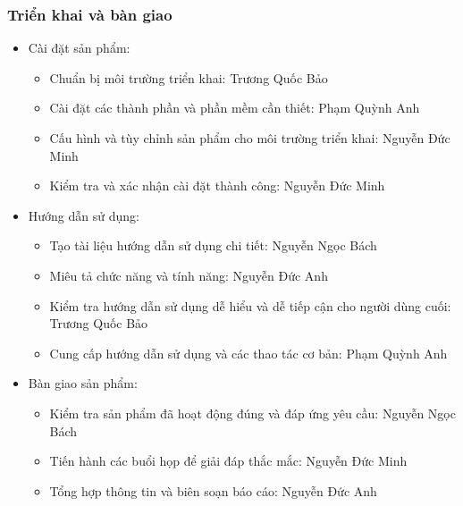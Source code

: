 \documentclass[12pt]{article}
\begin{document}
\subsubsection{Triển khai và bàn giao}
\begin{itemize}[label=-, leftmargin=1cm]
    \item Cài đặt sản phẩm:
    \begin{itemize}[label=+, leftmargin=1cm]
        \item Chuẩn bị môi trường triển khai: Trương Quốc Bảo
        \item Cài đặt các thành phần và phần mềm cần thiết: Phạm Quỳnh Anh
        \item Cấu hình và tùy chỉnh sản phẩm cho môi trường triển khai: Nguyễn Đức Minh
        \item Kiểm tra và xác nhận cài đặt thành công: Nguyễn Đức Minh
    \end{itemize}
    \item Hướng dẫn sử dụng:
    \begin{itemize}[label=+, leftmargin=1cm]
        \item Tạo tài liệu hướng dẫn sử dụng chi tiết: Nguyễn Ngọc Bách
        \item Miêu tả chức năng và tính năng: Nguyễn Đức Anh
        \item Kiểm tra hướng dẫn sử dụng dễ hiểu và dễ tiếp cận cho người dùng cuối: Trương Quốc Bảo
        \item Cung cấp hướng dẫn sử dụng và các thao tác cơ bản: Phạm Quỳnh Anh
    \end{itemize}
    \item Bàn giao sản phẩm: 
    \begin{itemize}[label=+, leftmargin=1cm]
        \item Kiểm tra sản phẩm đã hoạt động đúng và đáp ứng yêu cầu: Nguyễn Ngọc Bách
        \item Tiến hành các buổi họp để giải đáp thắc mắc: Nguyễn Đức Minh
        \item Tổng hợp thông tin và biên soạn báo cáo: Nguyễn Đức Anh
    \end{itemize}
\end{itemize}
\end{document}
